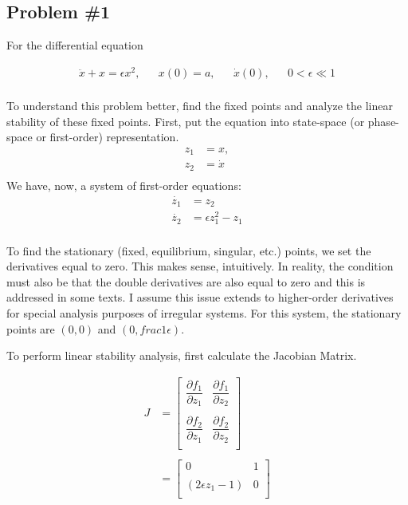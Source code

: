 \subsection*{Problem \#1}

For the differential equation

\begin{align}
	\label{DE}
	\ddot{x}+x = \epsilon x^2, && x(0)=a, && \dot{x}(0), && 0<\epsilon \ll 1 \\
\end{align}

To understand this problem better, find the fixed points and analyze the linear stability of these fixed points. First, put the equation into state-space (or phase-space or first-order) representation.
\begin{align*}
	z_1 &= x, \\ z_2 &= \dot{x} \\
\end{align*}
We have, now, a system of first-order equations: 
\begin{align*}
	\dot{z_1} &= z_2 \\
	\dot{z_2} &= \epsilon z_1^2 - z_1 \\
\end{align*}

To find the stationary (fixed, equilibrium, singular, etc.) points, we set the derivatives equal to zero. This makes sense, intuitively. In reality, the condition must also be that the double derivatives are also equal to zero and this is addressed in some texts. I assume this issue extends to higher-order derivatives for special analysis purposes of irregular systems. For this system, the stationary points are $(0,0)$ and $(0,frac{1}{\epsilon})$.

To perform linear stability analysis, first calculate the Jacobian Matrix.

\begin{align*}
	J &= 
	\begin{bmatrix}
	\dfrac{\partial f_1}{\partial z_1} & \dfrac{\partial f_1}{\partial z_2} \\ \\
	\dfrac{\partial f_2}{\partial z_1} & \dfrac{\partial f_2}{\partial z_2} \\
	\end{bmatrix} \\
	\\
	&= 
	\begin{bmatrix}
	0 & 1 \\ 	\\ 
	(2\epsilon z_1-1) & 0 \\
	\end{bmatrix} \\
\end{align*}


